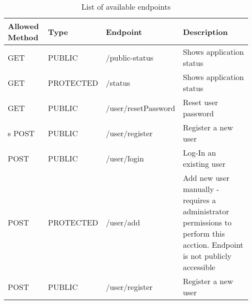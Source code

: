 \documentclass{article}
\begin{document}
\begin{table}[ht]
    \centering
    \begin{tabular}{|L{2cm}|L{2cm}|L{6cm}|L{6cm}|}
        \hline
        Allowed Method&Type&Endpoint&Description \\ \hline
        GET&PUBLIC&/public-status&Shows application status \\ \hline

        GET&PROTECTED&/status&Shows application status \\ \hline
        GET&PUBLIC&/user/resetPassword&Reset user password \\ \hline
s
        POST&PUBLIC&/user/register&Register a new user  \\ \hline
        POST&PUBLIC&/user/ľogin&Log-In an existing user \\ \hline
        POST&PROTECTED&/user/add&Add new user manually - requires a administrator permissions to perform this acction. Endpoint is not publicly accessible  \\ \hline
        POST&PUBLIC&/user/register&Register a new user  \\ \hline

    \end{tabular}
    \caption{List of available endpoints}
\end{table}
\end{document}
